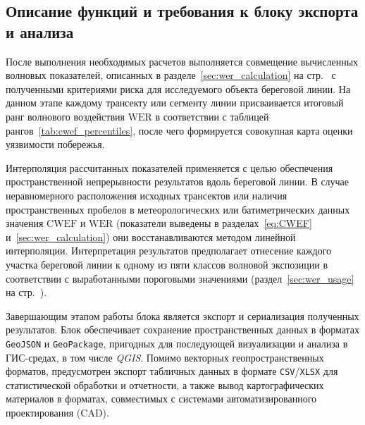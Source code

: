 




\subsection{Описание функций и требования к блоку экспорта и анализа}

После выполнения необходимых расчетов выполняется совмещение вычисленных
волновых показателей, описанных в разделе~\ref{sec:wer_calculation} на стр.~\pageref{sec:wer_calculation} с
полученными критериями риска для исследуемого объекта береговой линии.
На данном этапе каждому трансекту или сегменту линии присваивается итоговый
ранг волнового воздействия $\mathrm{WER}$ в соответствии с таблицей
рангов~\ref{tab:cwef_percentiles}, после чего формируется совокупная карта 
оценки уязвимости побережья.

Интерполяция рассчитанных показателей применяется с целью обеспечения
пространственной непрерывности результатов вдоль береговой линии.
В случае неравномерного расположения исходных трансектов или наличия
пространственных пробелов в метеорологических или батиметрических данных
значения $\mathrm{CWEF}$ и $\mathrm{WER}$ (показатели выведены в разделах~\ref{eq:CWEF} и~\ref{sec:wer_calculation}) они восстанавливаются методом
линейной интерполяции.
Интерпретация результатов предполагает отнесение каждого участка береговой линии к одному из пяти классов волновой экспозиции в соответствии с выработанными пороговыми значениями (раздел~\ref{sec:wer_usage} на стр.~\pageref{sec:wer_usage}).

Завершающим этапом работы блока является экспорт и сериализация
полученных результатов.
Блок обеспечивает сохранение пространственных данных в форматах
\texttt{GeoJSON} и \texttt{GeoPackage}, пригодных для
последующей визуализации и анализа в ГИС-средах, в том числе
\textit{QGIS}.
Помимо векторных геопространственных форматов, предусмотрен экспорт
табличных данных в формате \texttt{CSV}/\texttt{XLSX} для статистической
обработки и отчетности, а также вывод картографических материалов в
форматах, совместимых с системами автоматизированного проектирования (CAD).

